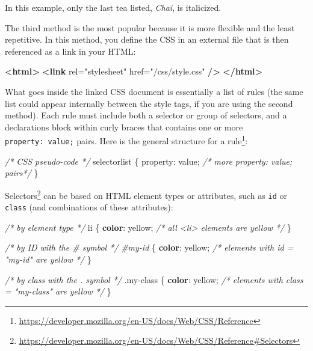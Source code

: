 \documentclass[12pt,]{krantz}
\makeatletter
\newenvironment{Shaded}{\begin{snugshade}}{\end{snugshade}}
\newcommand{\CommentTok}[1]{\textcolor[rgb]{0.56,0.35,0.01}{\textit{#1}}}
\newcommand{\DecValTok}[1]{\textcolor[rgb]{0.00,0.00,0.81}{#1}}
\newcommand{\FunctionTok}[1]{\textcolor[rgb]{0.00,0.00,0.00}{#1}}
\newcommand{\KeywordTok}[1]{\textcolor[rgb]{0.13,0.29,0.53}{\textbf{#1}}}
\newcommand{\NormalTok}[1]{#1}
\newcommand{\OtherTok}[1]{\textcolor[rgb]{0.56,0.35,0.01}{#1}}
\newcommand{\PreprocessorTok}[1]{\textcolor[rgb]{0.56,0.35,0.01}{\textit{#1}}}
\newcommand{\StringTok}[1]{\textcolor[rgb]{0.31,0.60,0.02}{#1}}
\renewcommand{\href}[2]{#2\footnote{\url{#1}}}
\newenvironment{kframe}{%
\medskip{}
\setlength{\fboxsep}{.8em}
 \def\at@end@of@kframe{}%
 \ifinner\ifhmode%
  \def\at@end@of@kframe{\end{minipage}}%
  \begin{minipage}{\columnwidth}%
 \fi\fi%
 \def\FrameCommand##1{\hskip\@totalleftmargin \hskip-\fboxsep
 \colorbox{shadecolor}{##1}\hskip-\fboxsep
     \hskip-\linewidth \hskip-\@totalleftmargin \hskip\columnwidth}%
 \MakeFramed {\advance\hsize-\width
   \@totalleftmargin\z@ \linewidth\hsize
   \@setminipage}}%
 {\par\unskip\endMakeFramed%
 \at@end@of@kframe}
\renewenvironment{Shaded}{\begin{kframe}}{\end{kframe}}
\theoremstyle{definition}
\theoremstyle{definition}
\theoremstyle{definition}
\theoremstyle{remark}
\makeatother
\begin{document}
In this example, only the last tea listed, \emph{Chai}, is italicized.

The third method is the most popular because it is more flexible and the
least repetitive. In this method, you define the CSS in an external file
that is then referenced as a link in your HTML:

\begin{Shaded}
\begin{Highlighting}[]
\KeywordTok{<html>}
    \KeywordTok{<link}\OtherTok{ rel=}\StringTok{"stylesheet"}\OtherTok{ href=}\StringTok{"/css/style.css"} \KeywordTok{/>}
\KeywordTok{</html>}
\end{Highlighting}
\end{Shaded}

What goes inside the linked CSS document is essentially a list of rules
(the same list could appear internally between the style tags, if you
are using the second method). Each rule must include both a selector or
group of selectors, and a declarations block within curly braces that
contains one or more \texttt{property:\ value;} pairs. Here is the
\href{https://developer.mozilla.org/en-US/docs/Web/CSS/Reference}{general
structure for a rule}:

\begin{Shaded}
\begin{Highlighting}[]
\CommentTok{/* CSS pseudo-code */}
\NormalTok{selectorlist \{}
\NormalTok{    property: value;}
    \CommentTok{/* more property: value; pairs*/}
\NormalTok{\}}
\end{Highlighting}
\end{Shaded}

\href{https://developer.mozilla.org/en-US/docs/Web/CSS/Reference\#Selectors}{Selectors}
can be based on HTML element types or attributes, such as \texttt{id} or
\texttt{class} (and combinations of these attributes):

\begin{Shaded}
\begin{Highlighting}[]
\CommentTok{/* by element type */}
\NormalTok{li \{ }
    \KeywordTok{color}\NormalTok{: }\DecValTok{yellow}\NormalTok{; }\CommentTok{/* all <li> elements are yellow */}
\NormalTok{\}}

\CommentTok{/* by ID with the # symbol */}
\PreprocessorTok{#my-id}\NormalTok{ \{ }
    \KeywordTok{color}\NormalTok{: }\DecValTok{yellow}\NormalTok{; }\CommentTok{/* elements with id = "my-id" are yellow */}
\NormalTok{\}}

\CommentTok{/* by class with the . symbol */}
\FunctionTok{.my-class}\NormalTok{ \{ }
    \KeywordTok{color}\NormalTok{: }\DecValTok{yellow}\NormalTok{; }\CommentTok{/* elements with class = "my-class" are yellow  */}
\NormalTok{\}}
\end{Highlighting}
\end{Shaded}
\end{document}
